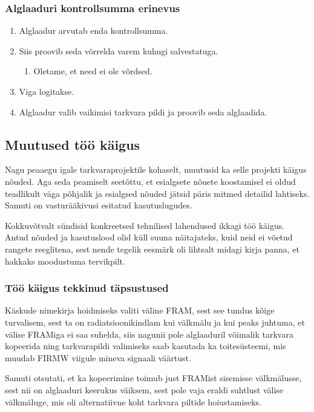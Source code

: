 \documentclass[12pt,a4paper]{article}
\begin{document}
\subsubsection{Alglaaduri kontrollsumma erinevus}
\begin{enumerate}
	\item Alglaadur arvutab enda kontrollsumma.
	\item Siis proovib seda võrrelda varem kuhugi salvestatuga.
		\begin{enumerate}
		\item Oletame, et need ei ole võrdsed.
		\end{enumerate}
	\item Viga logitakse.
	\item Alglaadur valib vaikimisi tarkvara pildi ja proovib seda alglaadida.
\end{enumerate}

\subsection{Muutused töö käigus}
Nagu peaaegu igale tarkvaraprojektile kohaselt, muutusid ka selle projekti
käigus nõuded. Aga seda peamiselt seetõttu, et esialgsete nõuete koostamisel ei
oldud teadlikult väga põhjalik ja esialgsed nõuded jätsid päris mitmed
detailid lahtiseks. Samuti on vasturääkivusi esitatud kasutuslugudes.

Kokkuvõtvalt sündisid konkreetsed tehnilised lahendused ikkagi töö käigus. Antud
nõuded ja kasutuslood olid küll suuna näitajateks, kuid neid ei võetud rangete
reeglitena, sest nende tegelik eesmärk oli lihtsalt midagi kirja panna, et
hakkaks moodustuma tervikpilt.

\subsubsection{Töö käigus tekkinud täpsustused}
Käskude nimekirja hoidmiseks valiti väline FRAM, sest see tundus kõige
turvalisem, sest ta on radiatsioonikindlam kui välkmälu ja kui peaks juhtuma, et
välise FRAMiga ei saa suhelda, siis nagunii pole alglaaduril võimalik tarkvara
kopeerida ning tarkvarapildi valimiseks saab kasutada ka toitesüsteemi, mis
muudab FIRMW viigule mineva signaali väärtust.

Samuti otsutati, et ka kopeerimine toimub just FRAMist sisemisse välkmälusse,
sest nii on alglaaduri keerukus väiksem, sest pole vaja eraldi suhtlust välise
välkmäluge, mis oli alternatiivne koht tarkvara piltide hoiustamiseks. 
\end{document}

